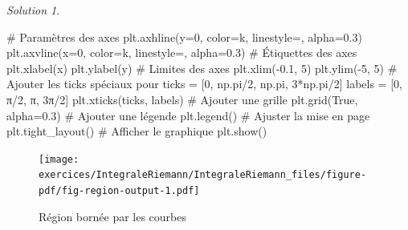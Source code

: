 \documentclass[
  12pt,
  letterpaper,
]{book}
\newenvironment{Shaded}{}{}
\newcommand{\CommentTok}[1]{\textcolor[rgb]{0.42,0.45,0.49}{#1}}
\newcommand{\DecValTok}[1]{\textcolor[rgb]{0.00,0.36,0.77}{#1}}
\newcommand{\FloatTok}[1]{\textcolor[rgb]{0.00,0.36,0.77}{#1}}
\newcommand{\NormalTok}[1]{\textcolor[rgb]{0.14,0.16,0.18}{#1}}
\newcommand{\OperatorTok}[1]{\textcolor[rgb]{0.14,0.16,0.18}{#1}}
\newcommand{\StringTok}[1]{\textcolor[rgb]{0.01,0.18,0.38}{#1}}
\newcommand{\VariableTok}[1]{\textcolor[rgb]{0.89,0.38,0.04}{#1}}
\theoremstyle{remark}
\newtheorem*{solution}{Solution}
\begin{document}
\begin{solution}
\begin{Shaded}
\begin{Highlighting}[]
\CommentTok{\# Paramètres des axes}
\NormalTok{plt.axhline(y}\OperatorTok{=}\DecValTok{0}\NormalTok{, color}\OperatorTok{=}\StringTok{\textquotesingle{}k\textquotesingle{}}\NormalTok{, linestyle}\OperatorTok{=}\StringTok{\textquotesingle{}{-}\textquotesingle{}}\NormalTok{, alpha}\OperatorTok{=}\FloatTok{0.3}\NormalTok{)}
\NormalTok{plt.axvline(x}\OperatorTok{=}\DecValTok{0}\NormalTok{, color}\OperatorTok{=}\StringTok{\textquotesingle{}k\textquotesingle{}}\NormalTok{, linestyle}\OperatorTok{=}\StringTok{\textquotesingle{}{-}\textquotesingle{}}\NormalTok{, alpha}\OperatorTok{=}\FloatTok{0.3}\NormalTok{)}
\CommentTok{\# Étiquettes des axes}
\NormalTok{plt.xlabel(}\StringTok{\textquotesingle{}x\textquotesingle{}}\NormalTok{)}
\NormalTok{plt.ylabel(}\StringTok{\textquotesingle{}y\textquotesingle{}}\NormalTok{)}
\CommentTok{\# Limites des axes}
\NormalTok{plt.xlim(}\OperatorTok{{-}}\FloatTok{0.1}\NormalTok{, }\DecValTok{5}\NormalTok{)}
\NormalTok{plt.ylim(}\OperatorTok{{-}}\DecValTok{5}\NormalTok{, }\DecValTok{5}\NormalTok{)}
\CommentTok{\# Ajouter les ticks spéciaux pour}
\NormalTok{ticks }\OperatorTok{=}\NormalTok{ [}\DecValTok{0}\NormalTok{, np.pi}\OperatorTok{/}\DecValTok{2}\NormalTok{, np.pi, }\DecValTok{3}\OperatorTok{*}\NormalTok{np.pi}\OperatorTok{/}\DecValTok{2}\NormalTok{]}
\NormalTok{labels }\OperatorTok{=}\NormalTok{ [}\StringTok{\textquotesingle{}0\textquotesingle{}}\NormalTok{, }\StringTok{\textquotesingle{}π/2\textquotesingle{}}\NormalTok{, }\StringTok{\textquotesingle{}π\textquotesingle{}}\NormalTok{, }\StringTok{\textquotesingle{}3π/2\textquotesingle{}}\NormalTok{]}
\NormalTok{plt.xticks(ticks, labels)}
\CommentTok{\# Ajouter une grille}
\NormalTok{plt.grid(}\VariableTok{True}\NormalTok{, alpha}\OperatorTok{=}\FloatTok{0.3}\NormalTok{)}
\CommentTok{\# Ajouter une légende}
\NormalTok{plt.legend()}
\CommentTok{\# Ajuster la mise en page}
\NormalTok{plt.tight\_layout()}
\CommentTok{\# Afficher le graphique}
\NormalTok{plt.show()}
\end{Highlighting}
\end{Shaded}

\begin{figure}[H]

{\centering \texttt{[image: exercices/IntegraleRiemann/IntegraleRiemann\_files/figure-pdf/fig-region-output-1.pdf]}

}

\caption{\label{fig-region}Région bornée par les courbes}

\end{figure}


\end{solution}
\end{document}
